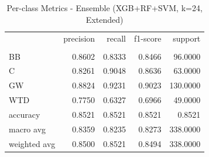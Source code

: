 \begin{table}
\caption{Per-class Metrics - Ensemble (XGB+RF+SVM, k=24, Extended)}
\label{tab:ensemble_ext_per_class}
\begin{tabular}{lrrrr}
\toprule
 & precision & recall & f1-score & support \\
 &  &  &  &  \\
\midrule
BB & 0.8602 & 0.8333 & 0.8466 & 96.0000 \\
C & 0.8261 & 0.9048 & 0.8636 & 63.0000 \\
GW & 0.8824 & 0.9231 & 0.9023 & 130.0000 \\
WTD & 0.7750 & 0.6327 & 0.6966 & 49.0000 \\
accuracy & 0.8521 & 0.8521 & 0.8521 & 0.8521 \\
macro avg & 0.8359 & 0.8235 & 0.8273 & 338.0000 \\
weighted avg & 0.8500 & 0.8521 & 0.8494 & 338.0000 \\
\bottomrule
\end{tabular}
\end{table}
